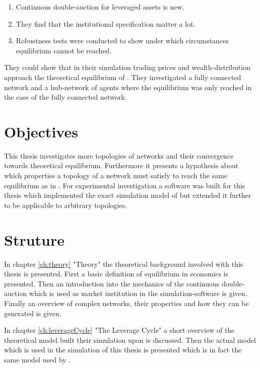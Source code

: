 \documentclass[Bachelorarbeit.tex]{subfiles}
\begin{document}
\begin{enumerate}
\item Continuous double-auction for leveraged assets is new.
\item They find that the institutional specification matter a lot.
\item Robustness tests were conducted to show under which circumstances equilibrium cannot be reached.
\end{enumerate}

They could show that in their simulation trading prices and wealth-distribution approach the theoretical equilibrium of \cite{Geanakoplos2009}. They investigated a fully connected network and a hub-network of agents where the equilibrium was only reached in the case of the fully connected network. 

\section{Objectives}
This thesis investigates more topologies of networks and their convergence towards theoretical equilibrium. Furthermore it presents a hypothesis about which properties a topology of a network must satisfy to reach the same equilibrium as in \cite{Breuer2015}. For experimental investigation a software was built for this thesis which implemented the exact simulation model of \cite{Breuer2015} but extended it further to be applicable to arbitrary topologies.

\section{Struture}
In chapter \ref{ch:theory} "Theory" the theoretical background involved with this thesis is presented. First a basic definition of equilibrium in economics is presented. Then an introduction into the mechanics of the continuous double-auction which is used as market institution in the simulation-software is given. Finally an overview of complex networks, their properties and how they can be generated is given.

\bigskip

In chapter \ref{ch:leverageCycle} "The Leverage Cycle" a short overview of the theoretical model \cite{Breuer2015} built their simulation upon is discussed. Then the actual model which is used in the simulation of this thesis is presented which is in fact the same model used by \cite{Breuer2015}.

\bigskip
\end{document}
